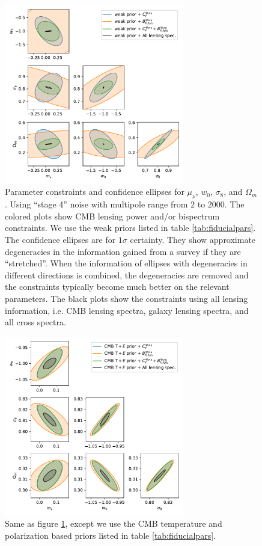 \documentclass[11pt]{article} %
\begin{document}

\begin{figure}
    \centering
    \includegraphics[width=0.7\textwidth]{figures/param_constraints_tight_cmb_weak_prior.pdf}
    \caption{Parameter constraints and confidence ellipses for $\mu_\nu$, $w_0$, $\sigma_8$, and $\Omega_m$. Using ``stage 4'' noise with multipole range from $2$ to $2000$. The colored plots show CMB lensing power and/or bispectrum constraints. We use the weak priors listed in table \ref{tab:fiducialpars}. The confidence ellipses are for $1\sigma$ certainty. They show approximate degeneracies in the information gained from a survey if they are ``stretched''. When the information of ellipses with degeneracies in different directions is combined, the degeneracies are removed and the constraints typically become much better on the relevant parameters. The black plots show the constraints using all lensing information, i.e. CMB lensing spectra, galaxy lensing spectra, and all cross spectra.}
    \label{fig:paramconstraintstightcmb}
\end{figure}

\begin{figure}
    \centering
    \includegraphics[width=0.7\textwidth]{figures/param_constraints_tight_cmb_cmb_prior.pdf}
    \caption{Same as figure \ref{fig:paramconstraintstightcmb}, except we use the CMB temperature and polarization based priors listed in table \ref{tab:fiducialpars}.}
    \label{fig:paramconstraintstightcmbcmbprior}
\end{figure}
\end{document}
